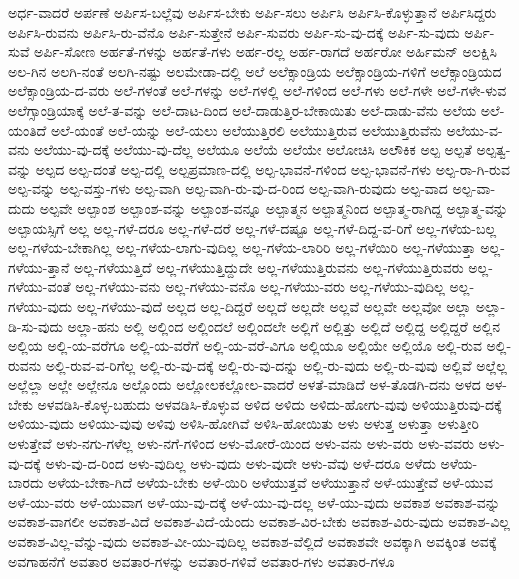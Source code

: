 {ಅರ್ಧ-ವಾದರೆ
ಅರ್ಪಣೆ
ಅರ್ಪಿಸ-ಬಲ್ಲೆವು
ಅರ್ಪಿಸ-ಬೇಕು
ಅರ್ಪಿ-ಸಲು
ಅರ್ಪಿಸಿ
ಅರ್ಪಿಸಿ-ಕೊಳ್ಳುತ್ತಾನೆ
ಅರ್ಪಿಸಿದ್ದರು
ಅರ್ಪಿಸಿ-ರುವನು
ಅರ್ಪಿಸಿ-ರು-ವೆನೊ
ಅರ್ಪಿ-ಸುತ್ತೇನೆ
ಅರ್ಪಿ-ಸುವರು
ಅರ್ಪಿ-ಸು-ವು-ದಕ್ಕೆ
ಅರ್ಪಿ-ಸು-ವುದು
ಅರ್ಪಿ-ಸುವೆ
ಅರ್ಪಿ-ಸೋಣ
ಅರ್ಹತೆ-ಗಳನ್ನು
ಅರ್ಹತೆ-ಗಳು
ಅರ್ಹ-ರಲ್ಲ
ಅರ್ಹ-ರಾಗದೆ
ಅರ್ಹರೋ
ಅರ್ಹಿಮನ್
ಅಲಕ್ಷಿಸಿ
ಅಲ-ಗಿನ
ಅಲಗಿ-ನಂತೆ
ಅಲಗಿ-ನಷ್ಟು
ಅಲಮೇಡಾ-ದಲ್ಲಿ
ಅಲೆ
ಅಲೆಕ್ಸಾಂಡ್ರಿಯ
ಅಲೆಕ್ಸಾಂಡ್ರಿಯ-ಗಳಿಗೆ
ಅಲೆಕ್ಸಾಂಡ್ರಿಯದ
ಅಲೆಕ್ಸಾಂಡ್ರಿಯ-ದ-ವರು
ಅಲೆ-ಗಳಂತೆ
ಅಲೆ-ಗಳನ್ನು
ಅಲೆ-ಗಳಲ್ಲಿ
ಅಲೆ-ಗಳಿಂದ
ಅಲೆ-ಗಳು
ಅಲೆ-ಗಳೇ
ಅಲೆ-ಗಳೇ-ಳುವ
ಅಲೆಗ್ಸಾಂಡ್ರಿಯಾಕ್ಕೆ
ಅಲೆ-ತ-ವನ್ನು
ಅಲೆ-ದಾಟ-ದಿಂದ
ಅಲೆ-ದಾಡುತ್ತಿರ-ಬೇಕಾಯಿತು
ಅಲೆ-ದಾಡು-ವೆನು
ಅಲೆಯ
ಅಲೆ-ಯಂತಿದೆ
ಅಲೆ-ಯಂತೆ
ಅಲೆ-ಯನ್ನು
ಅಲೆ-ಯಲು
ಅಲೆಯುತ್ತಿರಲಿ
ಅಲೆಯುತ್ತಿರುವ
ಅಲೆಯುತ್ತಿರುವೆನು
ಅಲೆಯು-ವ-ವನು
ಅಲೆಯು-ವು-ದಕ್ಕೆ
ಅಲೆಯು-ವು-ದೆಲ್ಲ
ಅಲೆಯೂ
ಅಲೆಯೆ
ಅಲೆಯೇ
ಅಲೋಚಿಸಿ
ಅಲೌಕಿಕ
ಅಲ್ಪ
ಅಲ್ಪತೆ
ಅಲ್ಪತ್ವ-ವನ್ನು
ಅಲ್ಪದ
ಅಲ್ಪ-ದಂತೆ
ಅಲ್ಪ-ದಲ್ಲಿ
ಅಲ್ಪಪ್ರಮಾಣ-ದಲ್ಲಿ
ಅಲ್ಪ-ಭಾವನೆ-ಗಳಿಂದ
ಅಲ್ಪ-ಭಾವನೆ-ಗಳು
ಅಲ್ಪ-ರಾ-ಗಿ-ರುವ
ಅಲ್ಪ-ವನ್ನು
ಅಲ್ಪ-ವಸ್ತು-ಗಳು
ಅಲ್ಪ-ವಾಗಿ
ಅಲ್ಪ-ವಾಗಿ-ರು-ವು-ದ-ರಿಂದ
ಅಲ್ಪ-ವಾಗಿ-ರುವುದು
ಅಲ್ಪ-ವಾದ
ಅಲ್ಪ-ವಾ-ದುದು
ಅಲ್ಪವೇ
ಅಲ್ಪಾಂಶ
ಅಲ್ಪಾಂಶ-ವನ್ನು
ಅಲ್ಪಾಂಶ-ವನ್ನೂ
ಅಲ್ಪಾತ್ಮನ
ಅಲ್ಪಾತ್ಮನಿಂದ
ಅಲ್ಪಾತ್ಮ-ರಾಗಿದ್ದ
ಅಲ್ಪಾತ್ಮ-ವನ್ನು
ಅಲ್ಪಾಯಸ್ಸಿಗೆ
ಅಲ್ಲ
ಅಲ್ಲ-ಗಳೆ-ದರೂ
ಅಲ್ಲ-ಗಳೆ-ದರೆ
ಅಲ್ಲ-ಗಳೆ-ದಷ್ಟೂ
ಅಲ್ಲ-ಗಳೆ-ದಿದ್ದ-ವ-ರಿಗೆ
ಅಲ್ಲ-ಗಳೆಯ-ಬಲ್ಲ
ಅಲ್ಲ-ಗಳೆಯ-ಬೇಕಾಗಿಲ್ಲ
ಅಲ್ಲ-ಗಳೆಯ-ಲಾಗು-ವುದಿಲ್ಲ
ಅಲ್ಲ-ಗಳೆಯ-ಲಾರಿರಿ
ಅಲ್ಲ-ಗಳೆಯಿರಿ
ಅಲ್ಲ-ಗಳೆಯುತ್ತಾ
ಅಲ್ಲ-ಗಳೆಯು-ತ್ತಾನೆ
ಅಲ್ಲ-ಗಳೆಯುತ್ತಿದೆ
ಅಲ್ಲ-ಗಳೆಯುತ್ತಿದ್ದುದೇ
ಅಲ್ಲ-ಗಳೆಯುತ್ತಿರುವನು
ಅಲ್ಲ-ಗಳೆಯುತ್ತಿರುವರು
ಅಲ್ಲ-ಗಳೆಯು-ವಂತೆ
ಅಲ್ಲ-ಗಳೆಯು-ವನು
ಅಲ್ಲ-ಗಳೆಯು-ವನೊ
ಅಲ್ಲ-ಗಳೆಯು-ವರು
ಅಲ್ಲ-ಗಳೆಯು-ವುದಿಲ್ಲ
ಅಲ್ಲ-ಗಳೆಯು-ವುದು
ಅಲ್ಲ-ಗಳೆಯು-ವುದೆ
ಅಲ್ಲದ
ಅಲ್ಲ-ದಿದ್ದರೆ
ಅಲ್ಲದೆ
ಅಲ್ಲದೇ
ಅಲ್ಲವೆ
ಅಲ್ಲವೇ
ಅಲ್ಲವೋ
ಅಲ್ಲಾ
ಅಲ್ಲಾ-ಡಿ-ಸು-ವುದು
ಅಲ್ಲಾ-ಹನು
ಅಲ್ಲಿ
ಅಲ್ಲಿಂದ
ಅಲ್ಲಿಂದಲೆ
ಅಲ್ಲಿಂದಲೇ
ಅಲ್ಲಿಗೆ
ಅಲ್ಲಿತ್ತು
ಅಲ್ಲಿದೆ
ಅಲ್ಲಿದ್ದ
ಅಲ್ಲಿದ್ದರೆ
ಅಲ್ಲಿನ
ಅಲ್ಲಿಯ
ಅಲ್ಲಿ-ಯ-ವರೆಗೂ
ಅಲ್ಲಿ-ಯ-ವರೆಗೆ
ಅಲ್ಲಿ-ಯ-ವರೆ-ವಿಗೂ
ಅಲ್ಲಿಯೂ
ಅಲ್ಲಿಯೇ
ಅಲ್ಲಿಯೊ
ಅಲ್ಲಿ-ರುವ
ಅಲ್ಲಿ-ರುವನು
ಅಲ್ಲಿ-ರುವ-ವ-ರಿಗೆಲ್ಲ
ಅಲ್ಲಿ-ರು-ವು-ದಕ್ಕೆ
ಅಲ್ಲಿ-ರು-ವು-ದನ್ನು
ಅಲ್ಲಿ-ರು-ವುದು
ಅಲ್ಲಿ-ರು-ವುವು
ಅಲ್ಲಿವೆ
ಅಲ್ಲೆಲ್ಲ
ಅಲ್ಲೆಲ್ಲಾ
ಅಲ್ಲೇ
ಅಲ್ಲೇನೂ
ಅಲ್ಲೊಂದು
ಅಲ್ಲೋಲಕಲ್ಲೋಲ-ವಾದರೆ
ಅಳತೆ-ಮಾಡಿದೆ
ಅಳ-ತೊಡಗಿ-ದನು
ಅಳದ
ಅಳ-ಬೇಕು
ಅಳವಡಿಸಿ-ಕೊಳ್ಳ-ಬಹುದು
ಅಳವಡಿಸಿ-ಕೊಳ್ಳುವ
ಅಳಿದ
ಅಳಿದು
ಅಳಿದು-ಹೋಗು-ವುವು
ಅಳಿಯುತ್ತಿರುವು-ದಕ್ಕೆ
ಅಳಿಯು-ವುದು
ಅಳಿಯು-ವುವು
ಅಳಿವು
ಅಳಿಸಿ-ಹೋಗಿವೆ
ಅಳಿಸಿ-ಹೋಯಿತು
ಅಳು
ಅಳುತ್ತ
ಅಳುತ್ತಾ
ಅಳುತ್ತೀರಿ
ಅಳುತ್ತೇವೆ
ಅಳು-ನಗು-ಗಳೆಲ್ಲ
ಅಳು-ನಗೆ-ಗಳಿಂದ
ಅಳು-ಮೋರೆ-ಯಿಂದ
ಅಳು-ವನು
ಅಳು-ವರು
ಅಳು-ವವರು
ಅಳು-ವು-ದಕ್ಕೆ
ಅಳು-ವು-ದ-ರಿಂದ
ಅಳು-ವುದಿಲ್ಲ
ಅಳು-ವುದು
ಅಳು-ವುದೇ
ಅಳು-ವೆವು
ಅಳೆ-ದರೂ
ಅಳೆದು
ಅಳೆಯ-ಬಾರದು
ಅಳೆಯ-ಬೇಕಾ-ಗಿದೆ
ಅಳೆಯ-ಬೇಕು
ಅಳೆ-ಯಿರಿ
ಅಳೆಯುತ್ತವೆ
ಅಳೆಯುತ್ತಾನೆ
ಅಳೆ-ಯುತ್ತೇವೆ
ಅಳೆ-ಯುವ
ಅಳೆ-ಯು-ವರು
ಅಳೆ-ಯುವಾಗ
ಅಳೆ-ಯು-ವು-ದಕ್ಕೆ
ಅಳೆ-ಯು-ವು-ದಲ್ಲ
ಅಳೆ-ಯು-ವುದು
ಅವಕಾಶ
ಅವಕಾಶ-ವನ್ನು
ಅವಕಾಶ-ವಾಗಲೀ
ಅವಕಾಶ-ವಿದೆ
ಅವಕಾಶ-ವಿದೆ-ಯೆಂದು
ಅವಕಾಶ-ವಿರ-ಬೇಕು
ಅವಕಾಶ-ವಿರು-ವುದು
ಅವಕಾಶ-ವಿಲ್ಲ
ಅವಕಾಶ-ವಿಲ್ಲ-ವೆನ್ನು-ವುದು
ಅವಕಾಶ-ವೀ-ಯು-ವುದಿಲ್ಲ
ಅವಕಾಶ-ವೆಲ್ಲಿದೆ
ಅವಕಾಶವೇ
ಅವಕ್ಕಾಗಿ
ಅವಕ್ಕಿಂತ
ಅವಕ್ಕೆ
ಅವಗಾಹನೆಗೆ
ಅವತಾರ
ಅವತಾರ-ಗಳನ್ನು
ಅವತಾರ-ಗಳಿವೆ
ಅವತಾರ-ಗಳು
ಅವತಾರ-ಗಳೂ
}
